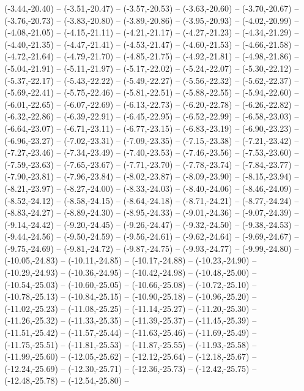 {  (-3.44,-20.40) -- (-3.51,-20.47) -- (-3.57,-20.53) -- (-3.63,-20.60) -- (-3.70,-20.67) -- (-3.76,-20.73) -- (-3.83,-20.80) --
  (-3.89,-20.86) -- (-3.95,-20.93) -- (-4.02,-20.99) -- (-4.08,-21.05) -- (-4.15,-21.11) -- (-4.21,-21.17) -- (-4.27,-21.23) --
  (-4.34,-21.29) -- (-4.40,-21.35) -- (-4.47,-21.41) -- (-4.53,-21.47) -- (-4.60,-21.53) -- (-4.66,-21.58) -- (-4.72,-21.64) --
  (-4.79,-21.70) -- (-4.85,-21.75) -- (-4.92,-21.81) -- (-4.98,-21.86) -- (-5.04,-21.91) -- (-5.11,-21.97) -- (-5.17,-22.02) --
  (-5.24,-22.07) -- (-5.30,-22.12) -- (-5.37,-22.17) -- (-5.43,-22.22) -- (-5.49,-22.27) -- (-5.56,-22.32) -- (-5.62,-22.37) --
  (-5.69,-22.41) -- (-5.75,-22.46) -- (-5.81,-22.51) -- (-5.88,-22.55) -- (-5.94,-22.60) -- (-6.01,-22.65) -- (-6.07,-22.69) --
  (-6.13,-22.73) -- (-6.20,-22.78) -- (-6.26,-22.82) -- (-6.32,-22.86) -- (-6.39,-22.91) -- (-6.45,-22.95) -- (-6.52,-22.99) --
  (-6.58,-23.03) -- (-6.64,-23.07) -- (-6.71,-23.11) -- (-6.77,-23.15) -- (-6.83,-23.19) -- (-6.90,-23.23) -- (-6.96,-23.27) --
  (-7.02,-23.31) -- (-7.09,-23.35) -- (-7.15,-23.38) -- (-7.21,-23.42) -- (-7.27,-23.46) -- (-7.34,-23.49) -- (-7.40,-23.53) --
  (-7.46,-23.56) -- (-7.53,-23.60) -- (-7.59,-23.63) -- (-7.65,-23.67) -- (-7.71,-23.70) -- (-7.78,-23.74) -- (-7.84,-23.77) --
  (-7.90,-23.81) -- (-7.96,-23.84) -- (-8.02,-23.87) -- (-8.09,-23.90) -- (-8.15,-23.94) -- (-8.21,-23.97) -- (-8.27,-24.00) --
  (-8.33,-24.03) -- (-8.40,-24.06) -- (-8.46,-24.09) -- (-8.52,-24.12) -- (-8.58,-24.15) -- (-8.64,-24.18) -- (-8.71,-24.21) --
  (-8.77,-24.24) -- (-8.83,-24.27) -- (-8.89,-24.30) -- (-8.95,-24.33) -- (-9.01,-24.36) -- (-9.07,-24.39) -- (-9.14,-24.42) --
  (-9.20,-24.45) -- (-9.26,-24.47) -- (-9.32,-24.50) -- (-9.38,-24.53) -- (-9.44,-24.56) -- (-9.50,-24.59) -- (-9.56,-24.61) --
  (-9.62,-24.64) -- (-9.69,-24.67) -- (-9.75,-24.69) -- (-9.81,-24.72) -- (-9.87,-24.75) -- (-9.93,-24.77) -- (-9.99,-24.80) --
  (-10.05,-24.83) -- (-10.11,-24.85) -- (-10.17,-24.88) -- (-10.23,-24.90) -- (-10.29,-24.93) -- (-10.36,-24.95) -- (-10.42,-24.98) --
  (-10.48,-25.00) -- (-10.54,-25.03) -- (-10.60,-25.05) -- (-10.66,-25.08) -- (-10.72,-25.10) -- (-10.78,-25.13) -- (-10.84,-25.15) --
  (-10.90,-25.18) -- (-10.96,-25.20) -- (-11.02,-25.23) -- (-11.08,-25.25) -- (-11.14,-25.27) -- (-11.20,-25.30) -- (-11.26,-25.32) --
  (-11.33,-25.35) -- (-11.39,-25.37) -- (-11.45,-25.39) -- (-11.51,-25.42) -- (-11.57,-25.44) -- (-11.63,-25.46) -- (-11.69,-25.49) --
  (-11.75,-25.51) -- (-11.81,-25.53) -- (-11.87,-25.55) -- (-11.93,-25.58) -- (-11.99,-25.60) -- (-12.05,-25.62) -- (-12.12,-25.64) --
  (-12.18,-25.67) -- (-12.24,-25.69) -- (-12.30,-25.71) -- (-12.36,-25.73) -- (-12.42,-25.75) -- (-12.48,-25.78) -- (-12.54,-25.80) --
}
